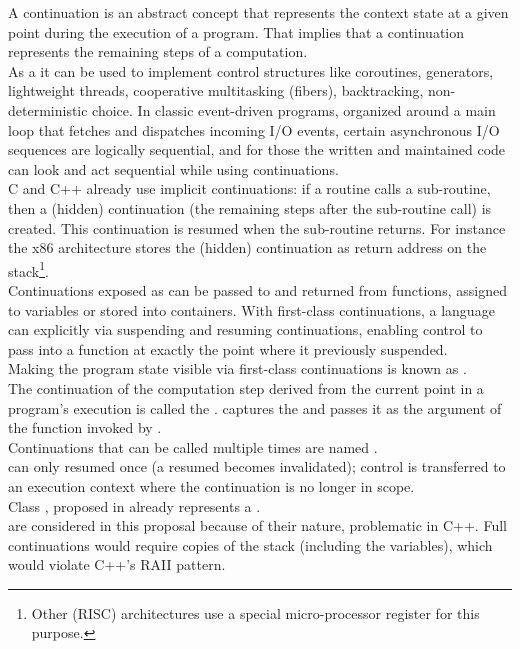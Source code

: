 
A continuation is an abstract concept that represents the context state at a
given point during the execution of a program. That implies that a continuation
represents the remaining steps of a computation.\\

As a  it can be used to implement control
structures like coroutines,  generators, lightweight threads, cooperative
multitasking (fibers), backtracking, non-deterministic choice. In classic
event-driven programs, organized around a main loop that fetches and dispatches
incoming I/O events, certain asynchronous I/O sequences are logically
sequential, and for those the written and maintained code can look and act
sequential while using continuations.\\

C and C++ already use implicit continuations: if a routine calls a sub-routine,
then a (hidden) continuation (the remaining steps after the sub-routine call) is
created. This continuation is resumed when the sub-routine returns. For
instance the x86 architecture stores the (hidden) continuation as return address
on the stack\footnote{Other (RISC) architectures use a special micro-processor
register for this purpose.}.\\

Continuations exposed as  can be passed to and
returned from functions, assigned to variables or stored into containers. With
first-class continuations, a language can explicitly  via suspending and resuming continuations, enabling control to pass
into a function at exactly the point where it previously suspended.\\
Making the program state visible via first-class continuations is known as
.\\

The continuation of the computation step derived from the current point in a
program's execution is called the . \cc captures the
 and passes it as the argument of the function invoked by
\cc.\\

Continuations that can be called multiple times are named
.\\
 can only resumed once (a resumed 
 becomes invalidated); control is transferred to
an execution context where the continuation is no longer in scope.\\
Class , proposed in \cite{P0099R1}
already represents a .\\
 are  considered in this proposal because of
their nature, problematic in C++. Full continuations would require copies of
the stack (including the variables), which would violate C++'s RAII pattern.\\


